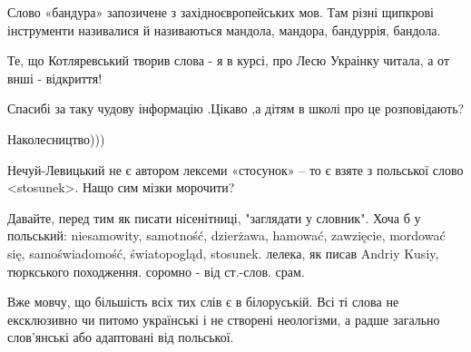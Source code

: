 \begin{itemize}
Слово «бандура» запозичене з західноєвропейських мов. Там різні щипкрові інструменти називалися й називаються мандола, мандора, бандуррія, бандола.

 
Те, що Котляревський творив слова - я в курсі, про Лесю Украінку читала, а от внші - відкриття!

 
Спасибі за таку чудову інформацію .Цікаво ,а дітям в школі про це розповідають?

 
Наколесництво)))

 
Нечуй-Левицький не є автором лексеми «стосунок» – то є взяте з польської слово <stosunek>. Нащо сим мізки морочити?

 

Давайте, перед тим як писати нісенітниці, "заглядати у словник". Хоча б у
польський: niesamowity, samotność, dzierżawa, hamować, zawzięcie, mordować się,
samoświadomość, światopogląd, stosunek. лелека, як писав Andriy Kusiy,
тюркського походження. соромно - від ст.-слов. срам.

Вже мовчу, що більшість всіх тих слів є в білоруській. Всі ті слова не
ексклюзивно чи питомо українські і не створені неологізми, а радше загально
слов'янські або адаптовані від польської.


\end{itemize}
